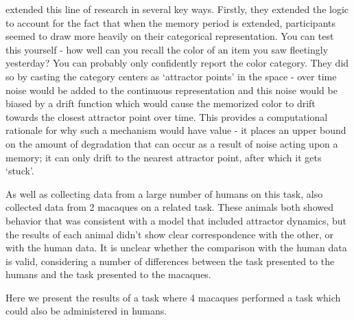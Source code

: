 \cite{panichello_error-correcting_2019} extended this line of research in several key ways. 
Firstly, they extended the logic to account for the fact that when the memory period is extended, participants seemed to draw more heavily on their categorical representation. You can test this yourself - how well can you recall the color of an item you saw fleetingly yesterday? 
You can probably only confidently report the color category. 
They did so by casting the category centers as `attractor points' in the space - over time noise would be added to the continuous representation and this noise would be biased by a drift function which would cause the memorized color to drift towards the closest attractor point over time. 
This provides a computational rationale for why such a mechanism would have value - it places an upper bound on the amount of degradation that can occur as a result of noise acting upon a memory; it can only drift to the nearest attractor point, after which it gets `stuck'.

As well as collecting data from a large number of humans on this task, \cite{panichello_error-correcting_2019} also collected data from 2 macaques on a related task. 
These animals both showed behavior that was consistent with a model that included attractor dynamics, but the results of each animal didn't show clear correspondence with the other, or with the human data.
It is unclear whether the comparison with the human data is valid, considering a number of differences between the task presented to the humans and the task presented to the macaques.

Here we present the results of a task where 4 macaques performed a task which could also be administered in humans.

